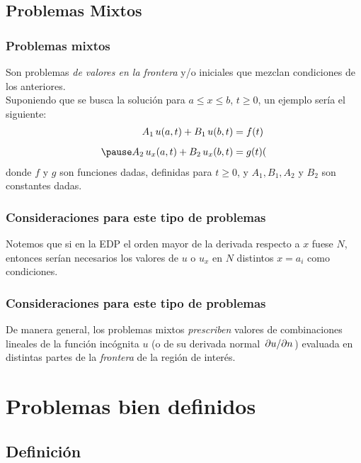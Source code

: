\documentclass[12pt]{beamer}
\begin{document}
\subsection{Problemas Mixtos}

\begin{frame}
\frametitle{Problemas mixtos}
Son problemas \emph{de valores en la frontera} y/o iniciales que mezclan condiciones de los anteriores.
\\
\bigskip
\pause
Suponiendo que se busca la solución para $a \leq x \leq b$, $t \geq 0$, un ejemplo sería el siguiente:
\begin{eqnarray}
A_{1} \, u(a, t) + B_{1} \, u(b, t) &= f(t) \label{eq:ecuacion_Z01_15} \\[0.5em] \pause
A_{2} \, u_{x}(a, t) + B_{2} \, u_{x}(b, t) &= g(t) (\label{eq:ecuacion_Z01_16}
\end{eqnarray}
donde $f$ y $g$ son funciones dadas, definidas para $t \geq 0$, y $A_{1}, B_{1}, A_{2}$ y $B_{2}$ son constantes dadas.
\end{frame}
\begin{frame}
\frametitle{Consideraciones para este tipo de problemas}
Notemos que si en la EDP el orden mayor de la derivada respecto a $x$ fuese $N$, entonces serían necesarios los valores de $u$ o $u_{x}$ en $N$ distintos $x = a_{i}$ como condiciones.
\end{frame}
\begin{frame}
\frametitle{Consideraciones para este tipo de problemas}
De manera general, los problemas mixtos \emph{prescriben} valores de combinaciones lineales de la función incógnita $u$ (o de su derivada normal $\pdv*{u}{n}$) evaluada en distintas partes de la \emph{frontera} de la región de interés.
\end{frame}

\section{Problemas bien definidos}
\subsection{Definición}
\end{document}
